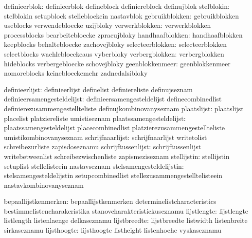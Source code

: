                 definieerblok:  definieerblok                defineblock
                                definiereblock               definujblok
                   stelblokin:  stelblokin                   setupblock
                                stelleblockein               nastavblok
               gebruikblokken:  gebruikblokken               useblocks
                                verwendebloecke              uzijbloky
               verwerkblokken:  verwerkblokken               processblocks
                                bearbeitebloecke             zpracujbloky
              handhaafblokken:  handhaafblokken              keepblocks
                                behaltebloecke               zachovejbloky
             selecteerblokken:  selecteerblokken             selectblocks
                                waehlebloeckeaus             vyberbloky
               verbergblokken:  verbergblokken               hideblocks
                                verbergebloecke              schovejbloky
              geenblokkenmeer:  geenblokkenmeer              nomoreblocks
                                keinebloeckemehr             zadnedalsibloky

               definieerlijst:  definieerlijst               definelist
                                definiereliste               definujseznam
  definieersamengesteldelijst:  definieersamengesteldelijst  definecombinedlist
                                definierezusammengestellteliste definujkombinovanyseznam
                  plaatslijst:  plaatslijst                  placelist
                                platziereliste               umistiseznam
     plaatssamengesteldelijst:  plaatssamengesteldelijst     placecombinedlist
                                platzierezusammengestellteliste umistikombinovanyseznam
             schrijfnaarlijst:  schrijfnaarlijst             writetolist
                                schreibezurliste             zapisdoseznamu
           schrijftussenlijst:  schrijftussenlijst           writebetweenlist
                                schreibezwischenliste        zapismeziseznam
                  stellijstin:  stellijstin                  setuplist
                                stellelisteein               nastavseznam
     stelsamengesteldelijstin:  stelsamengesteldelijstin     setupcombinedlist
                                stellezusammengestelltelisteein nastavkombinovanyseznam

         bepaallijstkenmerken:  bepaallijstkenmerken         determinelistcharacteristics
                                bestimmelistencharakeristika stanovcharakteristickuseznamu
                  lijstlengte:  lijstlengte                  listlength 
                                listenlaenge                 delkaseznamu
                 lijstbreedte:  lijstbreedte                 listwidth
                                listenbreite                 sirkaseznamu
                  lijsthoogte:  lijsthoogte                  listheight
                                listenhoehe                  vyskaseznamu

